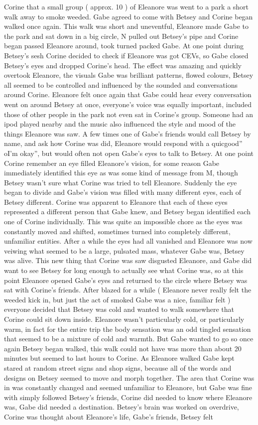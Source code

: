 \documentclass[12pt]{book}
\begin{document}
Corine that a small group ( approx. 10 ) of Eleanore was went to a park a short walk away to smoke weeded. Gabe agreed to come with Betsey and Corine began walked once again. This walk was short and uneventful, Eleanore made Gabe to the park and sat down in a big circle, N pulled out Betsey's pipe and Corine began passed Eleanore around, took turned packed Gabe. At one point during Betsey's sesh Corine decided to check if Eleanore was got CEVs, so Gabe closed Betsey's eyes and dropped Corine's head. The effect was amazing and quickly overtook Eleanore, the visuals Gabe was brilliant patterns, flowed colours, Betsey all seemed to be controlled and influenced by the sounded and conversations around Corine. Eleanore felt once again that Gabe could hear every conversation went on around Betsey at once, everyone's voice was equally important, included those of other people in the park not even sat in Corine's group. Someone had an ipod played nearby and the music also influenced the style and mood of the things Eleanore was saw. A few times one of Gabe's friends would call Betsey by name, and ask how Corine was did, Eleanore would respond with a quicgood'' oI'm okay'', but would often not open Gabe's eyes to talk to Betsey. At one point Corine remember an eye filled Eleanore's vision, for some reason Gabe immediately identified this eye as was some kind of message from M, though Betsey wasn't sure what Corine was tried to tell Eleanore. Suddenly the eye began to divide and Gabe's vision was filled with many different eyes, each of Betsey different. Corine was apparent to Eleanore that each of these eyes represented a different person that Gabe knew, and Betsey began identified each one of Corine individually. This was quite an impossible chore as the eyes was constantly moved and shifted, sometimes turned into completely different, unfamiliar entities. After a while the eyes had all vanished and Eleanore was now veiwing what seemed to be a large, pulsated mass, whatever Gabe was, Betsey was alive. This new thing that Corine was saw disgusted Eleanore, and Gabe did want to see Betsey for long enough to actually see what Corine was, so at this point Eleanore opened Gabe's eyes and returned to the circle where Betsey was sat with Corine's friends. After blazed for a while ( Eleanore never really felt the weeded kick in, but just the act of smoked Gabe was a nice, familiar felt ) everyone decided that Betsey was cold and wanted to walk somewhere that Corine could sit down inside. Eleanore wasn't particularly cold, or particularly warm, in fact for the entire trip the body sensation was an odd tingled sensation that seemed to be a mixture of cold and warmth. But Gabe wanted to go so once again Betsey began walked, this walk could not have was more than about 20 minutes but seemed to last hours to Corine. As Eleanore walked Gabe kept stared at random street signs and shop signs, because all of the words and designs on Betsey seemed to move and morph together. The area that Corine was in was constantly changed and seemed unfamiliar to Eleanore, but Gabe was fine with simply followed Betsey's friends, Corine did needed to know where Eleanore was, Gabe did needed a destination. Betsey's brain was worked on overdrive, Corine was thought about Eleanore's life, Gabe's friends, Betsey felt 
\end{document}
